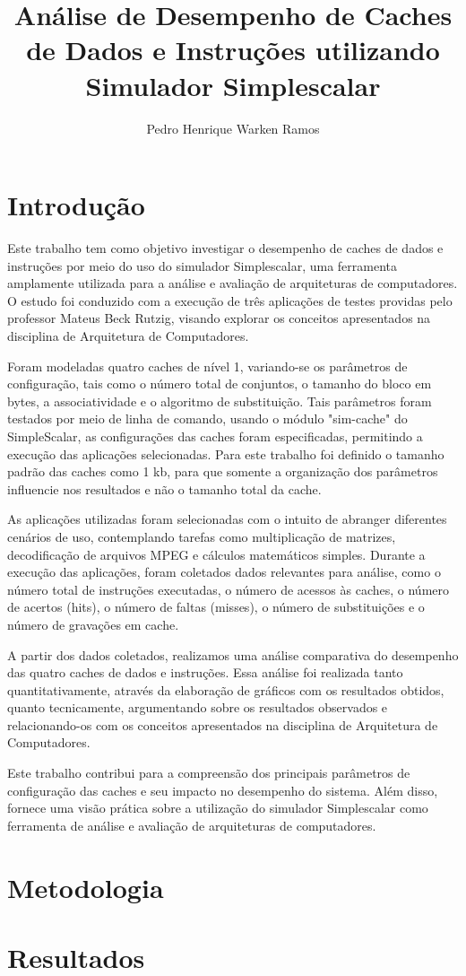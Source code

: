 \documentclass[12pt]{article}
\title{Análise de Desempenho de Caches de Dados e Instruções utilizando Simulador Simplescalar}
\author{Pedro Henrique Warken Ramos }
\begin{document}
 

\maketitle

\section{Introdução} \label{sec:introducao}

Este trabalho tem como objetivo investigar o desempenho de caches de dados e
instruções por meio do uso do simulador Simplescalar, uma ferramenta 
amplamente utilizada para a análise e avaliação de arquiteturas de 
computadores. O estudo foi conduzido com a execução de três aplicações de 
testes providas pelo professor Mateus Beck Rutzig, visando explorar os 
conceitos apresentados na disciplina de Arquitetura de Computadores.

Foram modeladas quatro caches de nível 1, variando-se os parâmetros de
configuração, tais como o número total de conjuntos, o 
tamanho do bloco em bytes, a associatividade e o algoritmo de substituição.
Tais parâmetros foram testados por meio de linha de comando, usando o módulo
"sim-cache" do SimpleScalar, as configurações das caches foram especificadas,
permitindo a execução das aplicações selecionadas. Para este trabalho foi
definido o tamanho padrão das caches como 1 kb, para que somente a 
organização dos parâmetros influencie nos resultados e não o tamanho total da cache.

As aplicações utilizadas foram selecionadas com o intuito de abranger 
diferentes cenários de uso, contemplando tarefas como multiplicação de 
matrizes, decodificação de arquivos MPEG e cálculos matemáticos simples. 
Durante a execução das aplicações, foram coletados dados relevantes para 
análise, como o número total de instruções executadas, o número de acessos às 
caches, o número de acertos (hits), o número de faltas (misses), o número de 
substituições e o número de gravações em cache.

A partir dos dados coletados, realizamos uma análise comparativa do desempenho 
das quatro caches de dados e instruções. Essa análise foi realizada tanto 
quantitativamente, através da elaboração de gráficos com os resultados 
obtidos, quanto tecnicamente, argumentando sobre os resultados observados e 
relacionando-os com os conceitos apresentados na disciplina de Arquitetura de 
Computadores.

Este trabalho contribui para a compreensão dos principais parâmetros 
de configuração das caches e seu impacto no desempenho do sistema. 
Além disso, fornece uma visão prática sobre a utilização do simulador
Simplescalar como ferramenta de análise e avaliação de arquiteturas de
computadores.

\section{Metodologia} \label{sec:metodologia}

\section{Resultados} \label{sec:resultados}
\end{document}
